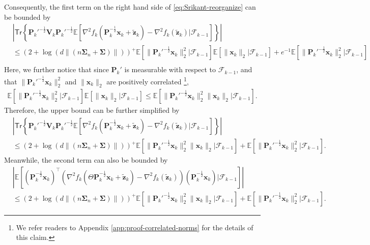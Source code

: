 Consequently, the first term on the right hand side of \eqref{eq:Srikant-reorganize} can be bounded by
\begin{align*}
&\left|\mathsf{Tr}\left\{\bm{P}_k'^{-\frac{1}{2}}\bm{V}_k\bm{P}_k'^{-\frac{1}{2}}\mathbb{E}\left[\nabla^2 f_k(\bm{P}_k^{-\frac{1}{2}}\bm{x}_k + \tilde{\bm{z}}_k)-\nabla^2 f_k(\tilde{\bm{z}}_k)\bigg|\mathscr{F}_{k-1}\right]\right\}\right| \\ 
&\leq (2+\log(d\|(n\bm{\Sigma}_n + \bm{\Sigma})\|))^+\mathbb{E}\left[\|\bm{P}_k'^{-\frac{1}{2}}\bm{x}_k\|_2^2 \bigg|\mathscr{F}_{k-1}\right] \mathbb{E}[\|\bm{x}_k\|_2 |\mathscr{F}_{k-1}] + e^{-1} \mathbb{E}\left[\|\bm{P}_k'^{-\frac{1}{2}}\bm{x}_k\|_2^2 \bigg|\mathscr{F}_{k-1}\right] \\ 
\end{align*}
Here, we further notice that since $\bm{P}_k'$ is measurable with respect to $\mathscr{F}_{k-1}$, and that $\|\bm{P}_k'^{-\frac{1}{2}}\bm{x}_k\|_2^2$ and $\|\bm{x}_k\|_2$ are positively correlated \footnote{We refer readers to Appendix \ref{app:proof-correlated-norms} for the details of this claim.}, 
\begin{align}\label{eq:correlated-norms}
\mathbb{E}\left[\|\bm{P}_k'^{-\frac{1}{2}}\bm{x}_k\|_2^2 \bigg|\mathscr{F}_{k-1}\right] \mathbb{E}[\|\bm{x}_k\|_2 |\mathscr{F}_{k-1}] \leq \mathbb{E}\left[\|\bm{P}_k'^{-\frac{1}{2}}\bm{x}_k\|_2^2 \|\bm{x}_k\|_2 \bigg|\mathscr{F}_{k-1}\right].
\end{align}
Therefore, the upper bound can be further simplified by
\begin{align*}
&\left|\mathsf{Tr}\left\{\bm{P}_k'^{-\frac{1}{2}}\bm{V}_k\bm{P}_k'^{-\frac{1}{2}}\mathbb{E}\left[\nabla^2 f_k(\bm{P}_k^{-\frac{1}{2}}\bm{x}_k + \tilde{\bm{z}}_k)-\nabla^2 f_k(\tilde{\bm{z}}_k)\bigg|\mathscr{F}_{k-1}\right]\right\}\right| \\ 
&\leq (2+\log(d\|(n\bm{\Sigma}_n + \bm{\Sigma})\|))^+ \mathbb{E}\left[\|\bm{P}_k'^{-\frac{1}{2}}\bm{x}_k\|_2^2 \|\bm{x}_k\|_2 \bigg|\mathscr{F}_{k-1}\right]+ \mathbb{E}\left[\|\bm{P}_k'^{-\frac{1}{2}}\bm{x}_k\|_2^2 \bigg|\mathscr{F}_{k-1}\right].
\end{align*}
Meanwhile, the second term can also be bounded by
\begin{align*}
&\left|\mathbb{E}\left[(\bm{P}_k^{-\frac{1}{2}}\bm{x}_k)^\top (\nabla^2f_k(\Theta \bm{P}_k^{-\frac{1}{2}}\bm{x}_k + \tilde{\bm{z}}_k) - \nabla^2 f_k(\tilde{\bm{z}}_k))(\bm{P}_k^{-\frac{1}{2}}\bm{x}_k) \bigg|\mathscr{F}_{k-1}\right]\right| \\ 
&\leq (2+\log(d\|(n\bm{\Sigma}_n + \bm{\Sigma})\|))^+ \mathbb{E}\left[\|\bm{P}_k'^{-\frac{1}{2}}\bm{x}_k\|_2^2 \|\bm{x}_k\|_2 \bigg|\mathscr{F}_{k-1}\right]+ \mathbb{E}\left[\|\bm{P}_k'^{-\frac{1}{2}}\bm{x}_k\|_2^2 \bigg|\mathscr{F}_{k-1}\right].
\end{align*}

